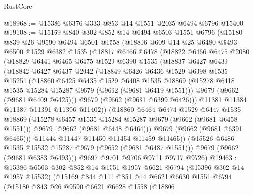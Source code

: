 \begin{lexlean}{RustCore}
\begin{coremodule}
@18968 := @15386 @6376 @333 @853 @14 @1551 @2035 @6494 @6796 @15400
@19108 := @15169
    @840
    @302
    @852
    @14
    @6494
    @6503
    @1551
    @6796
    (@15180
      @839
      @26
      @9590
      @6494
      @6501
      @1558
      (@18806
        @609
        @14
        @25
        @6480
        @6493
        @6500
        @1529
        @6382
        @1535
        (@18817
          @6466
          @6478
          (@18822
            @6466
            @6476
            @2080
            (@18829
              @6441
              @6465
              @6475
              @1529
              @6390
              @1535
              (@18837
                @6427
                @6439
                (@18842
                  @6427
                  @6437
                  @2042
                  (@18849
                    @6426
                    @6436
                    @1529
                    @6398
                    @1535
                    @15251
                    (@18860
                      @6425
                      @6435
                      @1529
                      @6408
                      @1535
                      @18869
                      (@15278 @6418 @1535 @15284 @15287 @9679 (@9662 (@9681 @6419 @1551)))
                      @9679
                      (@9662 (@9681 @6409 @6425)))
                    @9679
                    (@9662 (@9681 @6399 @6426)))
                  @11381
                  @11384
                  @11387
                  @11391
                  @11396
                  @11402))
              (@18860
                @6464
                @6474
                @1529
                @6447
                @1535
                @18869
                (@15278 @6457 @1535 @15284 @15287 @9679 (@9662 (@9681 @6458 @1551)))
                @9679
                (@9662 (@9681 @6448 @6464)))
              @9679
              (@9662 (@9681 @6391 @6465)))
            @11444
            @11447
            @11450
            @11454
            @11459
            @11465))
        (@15526 @6486 @1535 @15532 @15287 @9679 (@9662 (@9681 @6487 @1551)))
        @9679
        (@9662 (@9681 @6383 @6493)))
      @9697
      @9701
      @9706
      @9711
      @9717
      @9726)
@19463 := @15386
    @6503
    @302
    @852
    @14
    @1551
    @1957
    @6621
    @6794
    (@15396 @302 @14 @1957 @15532)
    (@15169
      @844
      @111
      @851
      @14
      @6621
      @6630
      @1551
      @6794
      (@15180
        @843
        @26
        @9590
        @6621
        @6628
        @1558
        (@18806

\end{coremodule}
\end{lexlean}
